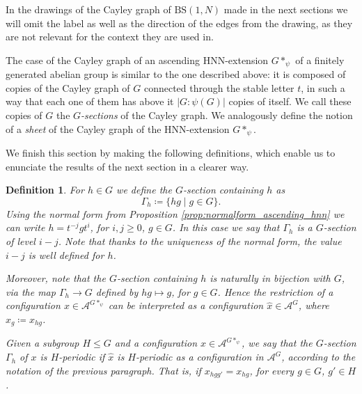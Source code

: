 \documentclass[cupthm,crop,info]{CUP-JNL-ETS}%
\theoremstyle{cupplain}
\theoremstyle{cupdefinition}
\newtheorem{definition}{Definition}[section]
\theoremstyle{cupremark}
\theoremstyle{cupproof}
\numberwithin{equation}{section}
\newcommand{\BS}[1][N]{\mathrm{BS}(1,#1)}
\begin{document}
In the drawings of the Cayley graph of $\BS$ made in the next sections we will omit the label as well as the direction of the edges from the drawing, as they are not relevant for the context they are used in.

The case of the Cayley graph of an ascending HNN-extension $G*_{\psi}$ of a finitely generated abelian group is similar to the one described above: it is composed of copies of the Cayley graph of $G$ connected through the stable letter $t$, in such a way that each one of them has above it $|G:\psi(G)|$ copies of itself. We call these copies of $G$ the $G$\textit{-sections} of the Cayley graph. We analogously define the notion of a \textit{sheet} of the Cayley graph of the HNN-extension $G*_{\psi}$.

We finish this section by making the following definitions, which enable us to enunciate the results of the next section in a clearer way.
\begin{definition}
	For $h\in G$ we define the \textit{$G$-section containing $h$} as
	$$
	\Gamma_{h}\coloneqq \{hg\mid g\in G \}.
	$$
	Using the normal form from Proposition \ref{prop:normalform_ascending_hnn} we can write $h=t^{-j}gt^i$, for $i,j\ge 0$, $g\in G$. In this case we say that $\Gamma_h$ is a \textit{$G$-section of level $i-j$}. Note that thanks to the uniqueness of the normal form, the value $i-j$ is well defined for $h$.

	Moreover, note that the $G$-section containing $h$ is naturally in bijection with $G$, via the map $\Gamma_h\to G$ defined by $hg\mapsto g$, for $g\in G$. Hence the restriction of a configuration $x\in \mathcal{A}^{G*_{\psi}}$ can be interpreted as a configuration $\hat{x}\in \mathcal{A}^{G}$, where $\hat{x}_{g}\coloneqq x_{hg}$.

	Given a subgroup $H\leqslant G$ and a configuration $x\in \mathcal{A}^{G*_{\psi}}$, we say that \textit{the $G$-section $\Gamma_h$ of $x$ is $H$-periodic} if $\hat{x}$ is $H$-periodic as a configuration in $\mathcal{A}^{G}$, according to the notation of the previous paragraph. That is, if $x_{hgg'}=x_{hg}$,  for every $g\in G$, $g'\in H$.
\end{definition}
\end{document}
